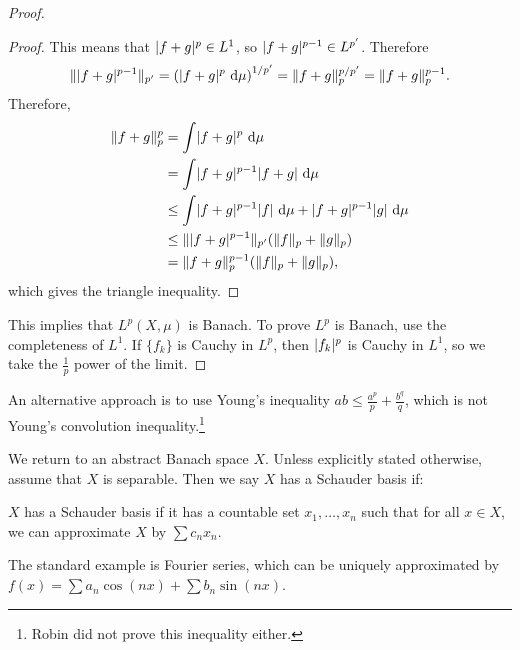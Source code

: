 \documentclass[10pt, twoside]{article}
\renewcommand{\d}{\ \mathrm{d}}
\begin{document}
\begin{thm}
\begin{proof}
\begin{mdframed}[style=default]
\begin{proof}
                    This means that $\lvert f+g\rvert^p \in L^1$, so $\lvert f+g\rvert^{p-1} \in L^{p'}$. Therefore
                    \[\norm{\abs{f+g}^{p-1}}_{p'} =\left( \abs{f+g}^p \d \mu \right)^{1/p'} = \norm{f+g}_p^{p/p'} = \norm{f+g}_p^{p-1}.\]
                    Therefore, 
                    \begin{align*}
                        \norm{f+g}_p^p &= \int \abs{f+g}^p \d \mu \\
                                       &= \int \abs{f+g}^{p-1}\abs{f+g} \d \mu \\
                                       &\leq \int \abs{f+g}^{p-1}\abs{f} \d \mu + \abs{f+g}^{p-1}\abs{g} \d \mu \\
                                       &\leq \norm{\abs{f+g}^{p-1}}_{p'}(\norm{f}_p + \norm{g}_p) \\
                                       &= \norm{f+g}_p^{p-1}(\norm{f}_p + \norm{g}_p),
                    \end{align*}
                    which gives the triangle inequality.
                \end{proof}
            \end{mdframed}
            This implies that $L^p(X,\mu)$ is Banach. To prove $L^p$ is Banach, use the completeness of $L^1$. If $\{f_k\}$ is Cauchy in $L^p$, then $\lvert f_k\rvert^p$ is Cauchy in $L^1$, so we take the $\frac{1}{p}$ power of the limit.
        \end{proof}
    \end{thm}

    An alternative approach is to use Young's inequality $ab \leq \frac{a^p}{p} + \frac{b^q}{q}$, which is not Young's convolution inequality.\footnote{Robin did not prove this inequality either.}

    We return to an abstract Banach space $X$. Unless explicitly stated otherwise, assume that $X$ is separable. Then we say $X$ has a Schauder basis if:

    \begin{defn}
        $X$ has a Schauder basis if it has a countable set $x_1, \ldots, x_n$ such that for all $x \in X$, we can approximate $X$ by $\sum c_nx_n$.
    \end{defn}

    \begin{exm}
        The standard example is Fourier series, which can be uniquely approximated by $f(x) = \sum a_n \cos(nx) + \sum b_n \sin(nx)$.
    \end{exm}
\end{document}
